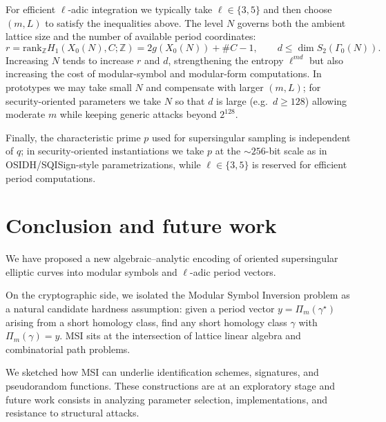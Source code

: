 \documentclass[10pt]{amsart}
\theoremstyle{theostyle}
\newcommand{\ZZ}{\mathbb{Z}}
\newcommand{\rank}{\mathrm{rank}}
\begin{document}
For efficient $\ell$-adic integration we typically take $\ell\in\{3,5\}$ and then
choose $(m,L)$ to satisfy the inequalities above.  The level $N$ governs both
the ambient lattice size and the number of available period coordinates:
\[
r=\rank_\ZZ H_1(X_0(N),C;\ZZ)=2g(X_0(N))+\#C-1,
\qquad
d\le \dim S_2(\Gamma_0(N)).
\]
Increasing $N$ tends to increase $r$ and $d$, strengthening the entropy
$\ell^{md}$ but also increasing the cost of modular-symbol and modular-form
computations.  In prototypes we may take small $N$ and compensate with larger
$(m,L)$; for security-oriented parameters we take $N$ so that $d$ is large
(e.g.\ $d\ge 128$) allowing moderate $m$ while keeping generic attacks beyond
$2^{128}$.

Finally, the characteristic prime $p$ used for supersingular
sampling is independent of $q$; in security-oriented instantiations we take
$p$ at the $\sim256$-bit scale as in OSIDH/SQISign-style
parametrizations, while $\ell\in\{3,5\}$ is reserved for efficient period
computations.


\section{Conclusion and future work}
\label{sec:conclusion}

We have proposed a new algebraic--analytic encoding of oriented supersingular
elliptic curves into modular symbols and $\ell$-adic period vectors. 


On the cryptographic side, we isolated the Modular Symbol Inversion problem as a natural candidate hardness assumption: given a period vector
$y=\Pi_m(\gamma^\star)$ arising from a short homology class, find any short
homology class $\gamma$ with $\Pi_m(\gamma)=y$. MSI sits at the intersection
of lattice linear algebra and combinatorial path problems. 

We sketched how MSI can underlie identification schemes, signatures, and pseudorandom functions. These constructions are at an exploratory stage and future work consists in analyzing parameter selection,
implementations, and resistance to structural attacks.
\end{document}
